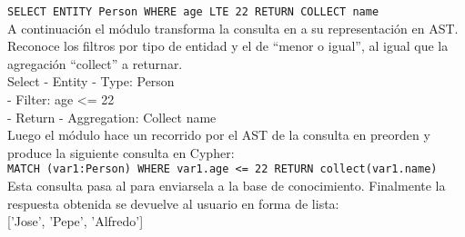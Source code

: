 \verb|SELECT ENTITY Person WHERE age LTE 22 RETURN COLLECT name|\\

A continuaci\'on el m\'odulo  transforma la consulta en  a su representaci\'on en AST. Reconoce los filtros por tipo de entidad y el de ``menor o igual'', al igual que la agregaci\'on ``collect'' a returnar.\\
Select - Entity - Type: Person\\
                - Filter: age <= 22\\
        - Return - Aggregation: Collect name\\
        

Luego el m\'odulo  hace un recorrido por el AST de la consulta en preorden y produce la siguiente consulta en Cypher:\\
\verb|MATCH (var1:Person) WHERE var1.age <= 22 RETURN collect(var1.name)|\\

Esta consulta pasa al  para enviarsela a la base de conocimiento. Finalmente la respuesta obtenida se devuelve al usuario en forma de lista:\\

['Jose', 'Pepe', 'Alfredo']



